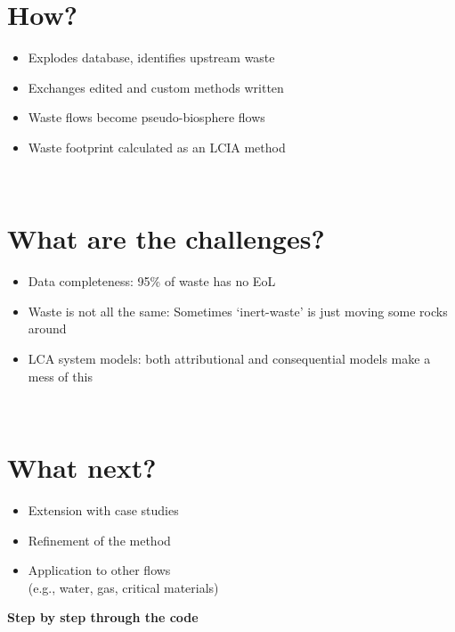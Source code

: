 \documentclass[a0paper,fleqn]{betterposter}
\begin{document}
{\section{How?}
\begin{itemize}
    \item Explodes database, identifies upstream waste
    \item Exchanges edited and custom methods written
    \item Waste flows become pseudo-biosphere flows
    \item Waste footprint calculated as an LCIA method
\end{itemize}\\

\section{What are the challenges?}
\begin{itemize}
    \item Data completeness: 95\% of waste has no EoL
    \item Waste is not all the same: Sometimes `inert-waste' is just moving some rocks around
    \item LCA system models: both attributional and consequential models make a mess of this
\end{itemize}\\

\section{What next?}
\begin{itemize}
    \item Extension with case studies
    \item Refinement of the method
    \item Application to other flows \\
    (e.g., water, gas, critical materials)
\end{itemize}

}{
{\selectfont\textbf{Step by step through the code}}\\

}
\end{document}
